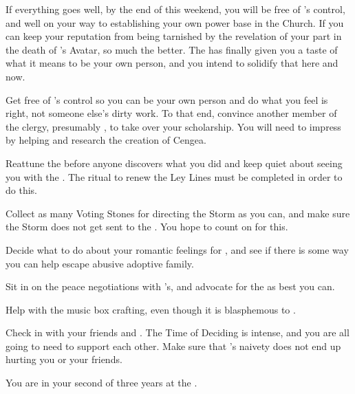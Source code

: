 \documentclass[char]{GL2020}
\begin{document}
If everything goes well, by the end of this weekend, you will be free of \cAntiChup{}'s control, and well on your way to establishing your own power base in the Church. If you can keep your reputation from being tarnished by the revelation of your part in the death of \cEbb{\intro}'s Avatar, so much the better. The \pSchool{} has finally given you a taste of what it means to be your own person, and you intend to solidify that here and now.

\begin{itemz}
    \item Get free of \cAntiChup{}’s control so you can be your own person and do what you feel is right, not someone else’s dirty work. To that end, convince another member of the \pTech{} clergy, presumably \cBeetle{}, to take over your scholarship. You will need to impress \cBeetle{} by helping \cEbbPriest{} and \cHeadScientist{} research the creation of Cengea.
    \item Reattune the \iScythe{} before anyone discovers what you did and keep \cChupStudent{} quiet about \cChupStudent{\them} seeing you with the \iScythe{}. The ritual to renew the Ley Lines must be completed in order to do this.
    \item Collect as many Voting Stones for directing the Storm as you can, and make sure the Storm does not get sent to the \pTech{}. You hope to count on \cHeadScientist{} for this.
   \item Decide what to do about your romantic feelings for \cAdopted{}, and see if there is some way you can help \cAdopted{\them} escape \cAdopted{\their} abusive adoptive family.
\end{itemz}

\begin{itemz}
    \item Sit in on the peace negotiations with \cAntiChup{}'s, and advocate for the \pTech{} as best you can.  
    \item Help \cAdopted{} with the music box \cAdopted{\theyare} crafting, even though it is blasphemous to \cFarmGod{\intro}.
    \item Check in with your friends \cTechStar{} and \cAmbition{}. The Time of Deciding is intense, and you are all going to need to support each other. Make sure that \cPresident{}’s naivety does not end up hurting you or your friends.
\end{itemz}

\begin{itemz}[Notes]
    \item You are in your second of three years at the \pSchool{}.
\end{itemz}
\end{document}
